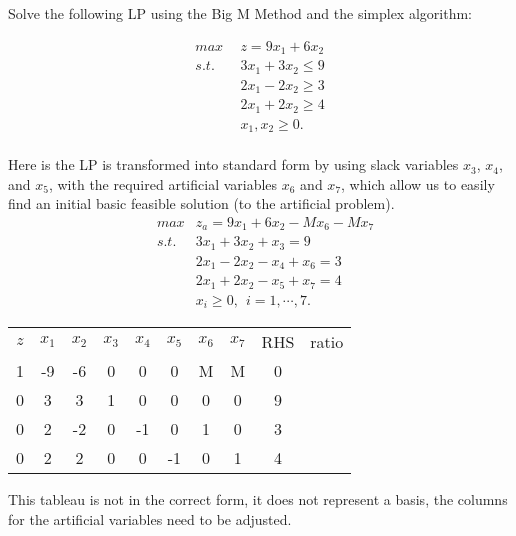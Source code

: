 \vspace{10mm}  Solve the following LP using the Big M Method and the simplex algorithm:

\begin{align*}
max~~ & z = 9x_1 + 6x_2 \\
s.t.~~
&  3x_1 + 3x_2 \le 9 \\
&  2x_1 - 2x_2 \ge 3 \\
&  2x_1 + 2x_2 \ge 4 \\
& x_1, x_2 \ge 0. \\
\end{align*}

Here is the LP is transformed into standard form by using slack variables $x_3$, $x_4$, and $x_5$, with the required artificial variables $x_6$ and $x_7$, which allow us to easily find an initial basic feasible solution (to the artificial problem).
\begin{eqnarray}
& max  & z_a = 9x_1 + 6x_2 -M x_6 - M x_7 \nonumber \\
& s.t. & 3x_1 + 3x_2 + x_3 = 9 \nonumber \\
&      & 2x_1 - 2x_2 - x_4 + x_6 = 3 \nonumber \\
&      & 2x_1 + 2x_2 - x_5 + x_7 = 4 \nonumber \\
&      & x_i \ge 0,~~ i =1,\cdots,7. \nonumber
\end{eqnarray}

\begin{center} \begin{tabular} {|c|c|c|c|c|c|c|c||c| r} \cline{1-9}
$z$	& $x_1$	& $x_2$	& $x_3$	& $x_4$	& $x_5$	& $x_6$	& $x_7$	& RHS &	ratio \\ \cline{1-9}
1	&	 -9 &	 -6 &	 0 &	  0 &	  0 &	  M &	  M &	0 & \\
0	&	  3 &	  3 &	 1 &	  0 &	  0 &	  0 &	  0 &	9 &	 \\
0	&	  2 &	 -2 &	 0 &	 -1 &	  0 &	  1 &	  0 &	3 & \\
0	&	  2 &	  2 &	 0 &	  0 &	 -1 &	  0 &	  1 &	4 &	 \\
\cline{1-9}
\end{tabular} \end{center}
\noindent This tableau is not in the correct form, it does not represent a basis, the columns for the artificial variables need to be adjusted.

